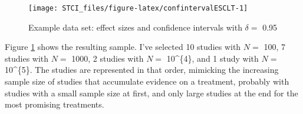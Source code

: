 \documentclass[]{book}
\newenvironment{Shaded}{\begin{snugshade}}{\end{snugshade}}
\newcommand{\KeywordTok}[1]{\textcolor[rgb]{0.13,0.29,0.53}{\textbf{#1}}}
\newcommand{\DataTypeTok}[1]{\textcolor[rgb]{0.13,0.29,0.53}{#1}}
\newcommand{\DecValTok}[1]{\textcolor[rgb]{0.00,0.00,0.81}{#1}}
\newcommand{\StringTok}[1]{\textcolor[rgb]{0.31,0.60,0.02}{#1}}
\newcommand{\OperatorTok}[1]{\textcolor[rgb]{0.81,0.36,0.00}{\textbf{#1}}}
\newcommand{\NormalTok}[1]{#1}
\theoremstyle{definition}
\theoremstyle{definition}
\theoremstyle{definition}
\theoremstyle{remark}
\begin{document}
\begin{Shaded}
\end{Shaded}

\begin{figure}[htbp]

{\centering \texttt{[image: STCI\_files/figure-latex/confintervalESCLT-1]} 

}

\caption{Example data set: effect sizes and confidence intervals with $\delta=$ 0.95}\label{fig:confintervalESCLT}
\end{figure}

Figure \ref{fig:confintervalESCLT} shows the resulting sample. I've
selected 10 studies with \(N=\) 100, 7 studies with \(N=\) 1000, 2
studies with \(N=\) 10\^{}\{4\}, and 1 study with \(N=\) 10\^{}\{5\}.
The studies are represented in that order, mimicking the increasing
sample size of studies that accumulate evidence on a treatment, probably
with studies with a small sample size at first, and only large studies
at the end for the most promising treatments.
\end{document}
